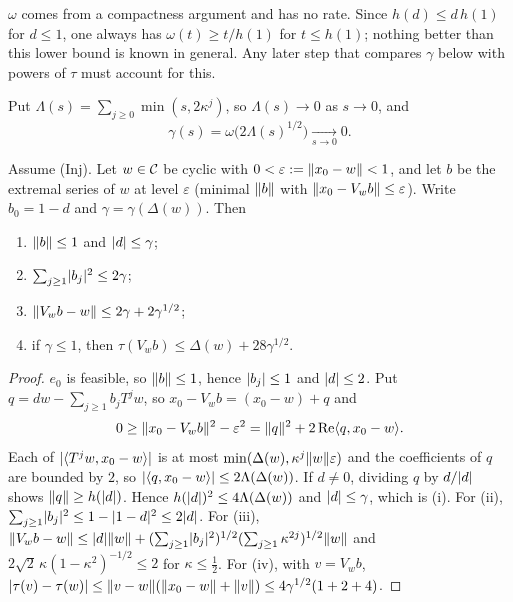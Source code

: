 \begin{remark}
$\omega$ comes from a compactness argument and has no rate. Since $h(d)\le d\,h(1)$ for $d\le1$,
one always has $\omega(t)\ge t/h(1)$ for $t\le h(1)$; nothing better than this lower bound is known in general.
Any later step that compares $\gamma$ below with powers of $\tau$ must account for this.
\end{remark}

Put $\Lambda(s)=\sum_{j\ge0}\min(s,2\kappa^j)$, so $\Lambda(s)\to0$ as $s\to0$, and
\[
\gamma(s)=\omega\bigl(2\Lambda(s)^{1/2}\bigr)\xrightarrow[s\to0]{}0 .
\]

\begin{proposition}\label{prop:domination}\stproved{}
Assume \textup{(Inj)}. Let $w\in\mathcal{C}$ be cyclic with $0<\varepsilon:=\lVert x_0-w\rVert<1$, and let $b$ be
the extremal series of $w$ at level $\varepsilon$ (minimal $\lVert b\rVert$ with
$\lVert x_0-V_wb\rVert\le\varepsilon$). Write $b_0=1-d$ and $\gamma=\gamma(\Delta(w))$. Then
\begin{enumerate}[label=(\roman*)]
\item $\lVert b\rVert\le1$ and $\lvert d\rvert\le\gamma$;
\item $\sum_{j\ge1}\lvert b_j\rvert^2\le2\gamma$;
\item $\lVert V_wb-w\rVert\le2\gamma+2\gamma^{1/2}$;
\item if $\gamma\le1$, then $\tau(V_wb)\le\Delta(w)+28\gamma^{1/2}$.
\end{enumerate}
\end{proposition}
\begin{proof}
$e_0$ is feasible, so $\lVert b\rVert\le1$, hence $\lvert b_j\rvert\le1$ and $\lvert d\rvert\le2$. Put
$q=dw-\sum_{j\ge1}b_jT^jw$, so $x_0-V_wb=(x_0-w)+q$ and
\[
0\ge\lVert x_0-V_wb\rVert^2-\varepsilon^2=\lVert q\rVert^2+2\operatorname{Re}\langle q,x_0-w\rangle.
\]
Each of $\lvert \langle T^jw,x_0-w\rangle\rvert$ is at most $\min(\Delta(w),\kappa^j\lVert w\rVert\varepsilon)$ and the
coefficients of $q$ are bounded by $2$, so $\lvert \langle q,x_0-w\rangle\rvert\le2\Lambda(\Delta(w))$. If $d\ne0$,
dividing $q$ by $d/\lvert d\rvert$ shows $\lVert q\rVert\ge h(\lvert d\rvert)$. Hence $h(\lvert d\rvert)^2\le4\Lambda(\Delta(w))$
and $\lvert d\rvert\le\gamma$, which is (i). For (ii),
$\sum_{j\ge1}\lvert b_j\rvert^2\le1-\lvert 1-d\rvert^2\le2\lvert d\rvert$. For (iii),
$\lVert V_wb-w\rVert\le\lvert d\rvert\lVert w\rVert+(\sum_{j\ge1}\lvert b_j\rvert^2)^{1/2}(\sum_{j\ge1}\kappa^{2j})^{1/2}\lVert w\rVert$
and $2\sqrt2\,\kappa(1-\kappa^2)^{-1/2}\le2$ for $\kappa\le\frac12$. For (iv), with
$v=V_wb$,
$\lvert \tau(v)-\tau(w)\rvert\le\lVert v-w\rVert(\lVert x_0-w\rVert+\lVert v\rVert)\le4\gamma^{1/2}(1+2+4)$.
\end{proof}

